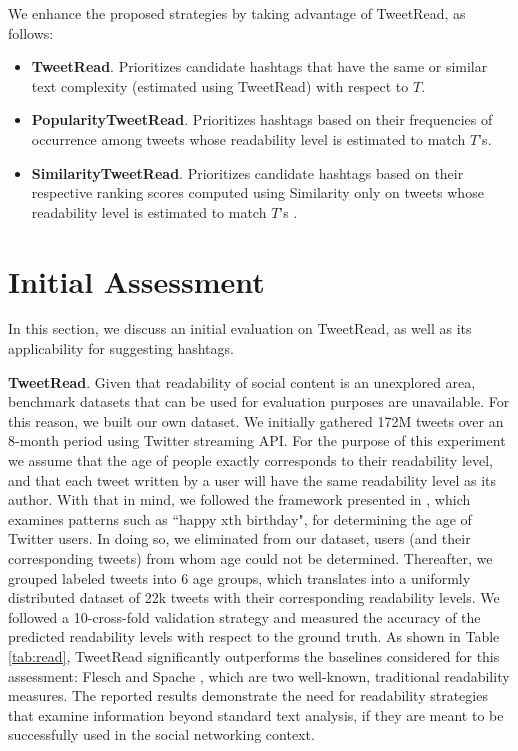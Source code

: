 \documentclass{sig-alternate-05-2015}
\begin{document}
We enhance the proposed strategies by taking advantage of TweetRead, as follows:
\begin{itemize}
\item \textbf{TweetRead}. Prioritizes candidate hashtags that have the same or similar text complexity (estimated using TweetRead) with respect to $T$.
\item \textbf{PopularityTweetRead}. Prioritizes hashtags based on their frequencies of occurrence among tweets whose readability level is estimated to match $T$'s.
\item \textbf{SimilarityTweetRead}. Prioritizes candidate hashtags based on their respective ranking scores computed using Similarity only on tweets whose readability level is estimated to match $T$'s . 
\end{itemize}

\section{Initial Assessment}
In this section, we discuss an initial evaluation on TweetRead, as well as its applicability for suggesting hashtags.

\textbf{TweetRead}. Given that readability of social content is an unexplored area, benchmark datasets that can be used for evaluation purposes are unavailable. For this reason, we built our own dataset. We initially gathered 172M tweets over an 8-month period using Twitter streaming API. For the purpose of this experiment we assume that the age of people exactly corresponds to their readability level, and that each tweet written by a user will have the same readability level as its author. With that in mind, we followed the framework presented in \cite{age}, which examines patterns such as ``happy xth birthday", for determining the age of Twitter users. In doing so, we eliminated from our dataset, users (and their corresponding tweets) from whom age  could not be determined. Thereafter, we grouped labeled tweets into 6 age groups, which translates into a uniformly distributed dataset of 22k tweets with their corresponding readability levels. %
We followed a 10-cross-fold validation strategy and measured the accuracy of the predicted readability levels with respect to the ground truth. 
As shown in Table \ref{tab:read}, TweetRead significantly outperforms the baselines considered for this assessment: Flesch \cite{Fle48} and Spache \cite{spache1953new}, which are two well-known, traditional readability measures. The reported results demonstrate the need for readability strategies that examine information beyond standard text analysis, if they are meant to be successfully used in the social networking context.
\end{document}
